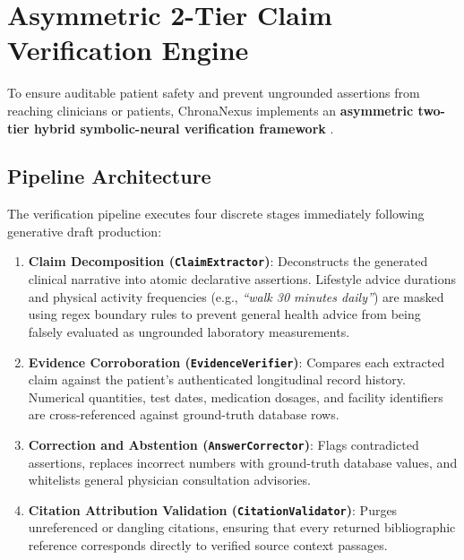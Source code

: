 \section{Asymmetric 2-Tier Claim Verification Engine}
\label{sec:verification_engine}

To ensure auditable patient safety and prevent ungrounded assertions from reaching clinicians or patients, ChronaNexus implements an \textbf{asymmetric two-tier hybrid symbolic-neural verification framework} \cite{yang2022gatortron,thorne2018fever,zha2023alignscore}.

\subsection{Pipeline Architecture}
The verification pipeline executes four discrete stages immediately following generative draft production:
\begin{enumerate}
  \item \textbf{Claim Decomposition (\texttt{ClaimExtractor})}: Deconstructs the generated clinical narrative into atomic declarative assertions. Lifestyle advice durations and physical activity frequencies (e.g., \textit{``walk 30 minutes daily''}) are masked using regex boundary rules to prevent general health advice from being falsely evaluated as ungrounded laboratory measurements.
  \item \textbf{Evidence Corroboration (\texttt{EvidenceVerifier})}: Compares each extracted claim against the patient's authenticated longitudinal record history. Numerical quantities, test dates, medication dosages, and facility identifiers are cross-referenced against ground-truth database rows.
  \item \textbf{Correction and Abstention (\texttt{AnswerCorrector})}: Flags contradicted assertions, replaces incorrect numbers with ground-truth database values, and whitelists general physician consultation advisories.
  \item \textbf{Citation Attribution Validation (\texttt{CitationValidator})}: Purges unreferenced or dangling citations, ensuring that every returned bibliographic reference corresponds directly to verified source context passages.
\end{enumerate}

